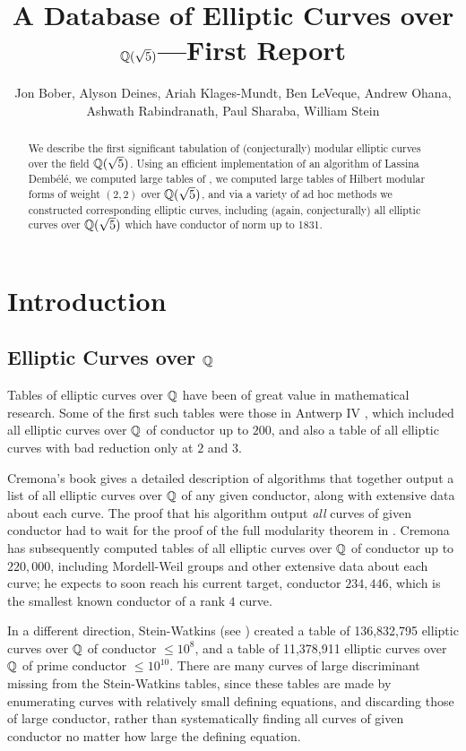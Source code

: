 \documentclass{amsart}
\title{A Database of Elliptic Curves over $\mathbb{Q}(\sqrt{5})$---First Report}
\author[Bober et al.]{Jon Bober, Alyson Deines, Ariah Klages-Mundt, Ben
  LeVeque, Andrew Ohana, Ashwath Rabindranath, Paul Sharaba, William
  Stein}
\newcommand{\dembele}{Demb\'el{\'e}\xspace}
\begin{document}
\begin{abstract} 
We describe the first significant tabulation of (conjecturally) modular
elliptic curves over the field $\mathbb{Q}(\sqrt5)$. Using an efficient implementation
of an algorithm of Lassina \dembele, we computed large tables of 
\cite{dembele:hilbert5}, we computed large tables of Hilbert modular
forms of weight $(2,2)$ over $\mathbb{Q}(\sqrt 5)$, and via a variety of ad hoc
methods we constructed corresponding elliptic curves, including
(again, conjecturally) all elliptic curves over $\mathbb{Q}(\sqrt5)$ which have
conductor of norm up to 1831. 
\end{abstract} 

\maketitle

\section{Introduction}\label{sec:intro}

\subsection{Elliptic Curves over $\mathbb{Q}$}
Tables of elliptic curves over $\mathbb{Q}$ have been of great value in
mathematical research.  Some of the first such tables were those in
Antwerp IV \cite{antwerpiv}, which included all elliptic curves over
$\mathbb{Q}$ of conductor up to $200$, and also a table of all elliptic curves
with bad reduction only at $2$ and $3$.  

Cremona's book \cite{cremona:algs} gives a detailed description of
algorithms that together output a list of all elliptic curves over
$\mathbb{Q}$ of any given conductor, along with extensive data about each
curve.  The proof that his algorithm output {\em all} curves of given
conductor had to wait for the proof of the full modularity theorem in
\cite{breuil-conrad-diamond-taylor}.  Cremona has subsequently
computed tables \cite{cremona:onlinetables} of all elliptic curves
over $\mathbb{Q}$ of conductor up to $220,\!000$, including Mordell-Weil
groups and other extensive data about each curve; he expects to soon
reach his current target, conductor $234,\!446$, which is the smallest
known conductor of a rank $4$ curve.

In a different direction, Stein-Watkins (see \cite{stein-watkins:ants5, bmsw:bulletins}) 
created a table of 136,832,795 elliptic curves over $\mathbb{Q}$ of conductor $\leq 10^8$, and a
table of 11,378,911 elliptic curves over $\mathbb{Q}$ of prime conductor $\leq
10^{10}$. 
There are many curves of large discriminant missing from the
Stein-Watkins tables, since these tables are made by enumerating
curves with relatively small defining equations, and discarding those
of large conductor, rather than systematically finding all curves of
given conductor no matter how large the defining equation.
\end{document}

